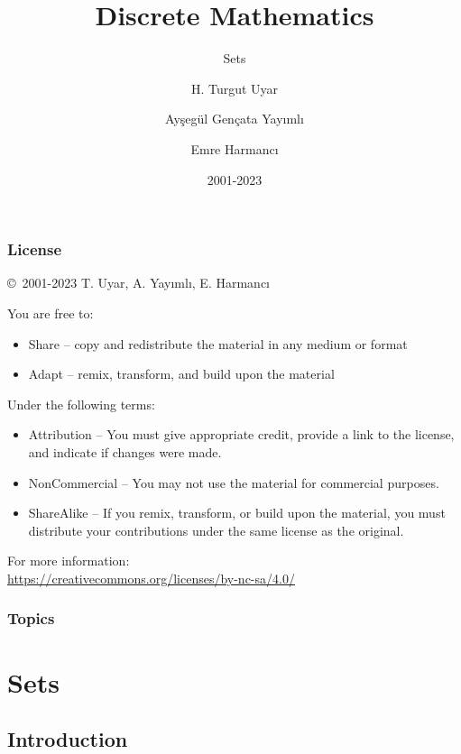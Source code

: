 \documentclass[dvipsnames]{beamer}
\title{Discrete Mathematics}
\subtitle{Sets}
\author{H. Turgut Uyar \and Ayşegül Gençata Yayımlı \and Emre Harmancı}
\date{2001-2023}
\begin{document}
\begin{frame}
  \titlepage
\end{frame}

\begin{frame}
  \frametitle{License}

  \hfill
  \copyright~2001-2023 T. Uyar, A. Yayımlı, E. Harmancı

  \vfill
  \begin{footnotesize}
    You are free to:
    \begin{itemize}
      \itemsep0em
      \item Share -- copy and redistribute the material in any medium or format
      \item Adapt -- remix, transform, and build upon the material
    \end{itemize}

    Under the following terms:
    \begin{itemize}
      \itemsep0em
      \item Attribution -- You must give appropriate credit, provide a link to
        the license, and indicate if changes were made.

      \item NonCommercial -- You may not use the material for commercial
        purposes.

      \item ShareAlike -- If you remix, transform, or build upon the material,
        you must distribute your contributions under the same license as the
        original.
    \end{itemize}
  \end{footnotesize}

  \begin{small}
    For more information:\\
    \url{https://creativecommons.org/licenses/by-nc-sa/4.0/}
  \end{small}
\end{frame}

\begin{frame}
  \frametitle{Topics}
  \tableofcontents
\end{frame}

\section{Sets}

\subsection{Introduction}
\end{document}
